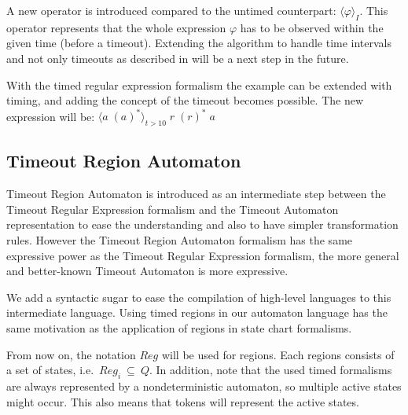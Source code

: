 	
			A new operator is introduced compared to the untimed counterpart: $\langle \varphi \rangle_I$. This operator represents that the whole expression $\varphi$ has to be observed within the given time (before a timeout).	
			Extending the algorithm to handle time intervals and not only timeouts as described in \citep{tre} will be a next step in the future.
	
			With the timed regular expression formalism the example can be extended with timing, and adding the concept of the timeout becomes possible.
			The new expression will be: $ \langle a \; (a)^\ast \rangle_{t > 10} \; r \; (r)^\ast \; a$
			
\subsection{Timeout Region Automaton}
			
Timeout Region Automaton is introduced as an intermediate step between the Timeout Regular Expression formalism and the Timeout Automaton representation to ease the understanding and also to have simpler transformation rules.
However the Timeout Region Automaton formalism has the same expressive power as the Timeout Regular Expression formalism, the more general and better-known Timeout Automaton is more expressive.
			
We add a syntactic sugar to ease the compilation of high-level languages to this intermediate language.
Using timed regions in our automaton language has the same motivation as the application of regions in state chart formalisms.
			
From now on, the notation $\mathit{Reg}$ will be used for regions. Each regions consists of a  set of states, i.e.~$\mathit{Reg}_{i}~\subseteq~Q$. In addition, note that the used timed formalisms are always represented by a nondeterministic automaton, so multiple active states might occur. This also means that tokens will represent the active states.
			
